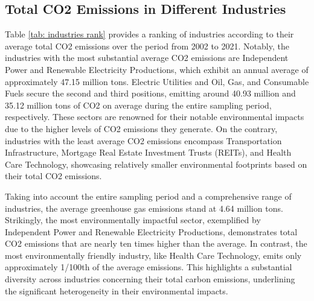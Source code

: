 \documentclass[12pt]{article}
\begin{document}
\subsection{Total CO2 Emissions in Different Industries}

Table \ref{tab: industries rank} provides a ranking of industries according to their average total CO2 emissions over the period from 2002 to 2021. Notably, the industries with the most substantial average CO2 emissions are Independent Power and Renewable Electricity Productions, which exhibit an annual average of approximately 47.15 million tons. Electric Utilities and Oil, Gas, and Consumable Fuels secure the second and third positions, emitting around 40.93 million and 35.12 million tons of CO2 on average during the entire sampling period, respectively. These sectors are renowned for their notable environmental impacts due to the higher levels of CO2 emissions they generate. On the contrary, industries with the least average CO2 emissions encompass Transportation Infrastructure, Mortgage Real Estate Investment Trusts (REITs), and Health Care Technology, showcasing relatively smaller environmental footprints based on their total CO2 emissions.

Taking into account the entire sampling period and a comprehensive range of industries, the average greenhouse gas emissions stand at 4.64 million tons. Strikingly, the most environmentally impactful sector, exemplified by Independent Power and Renewable Electricity Productions, demonstrates total CO2 emissions that are nearly ten times higher than the average. In contrast, the most environmentally friendly industry, like Health Care Technology, emits only approximately 1/100th of the average emissions. This highlights a substantial diversity across industries concerning their total carbon emissions, underlining the significant heterogeneity in their environmental impacts.
\end{document}

